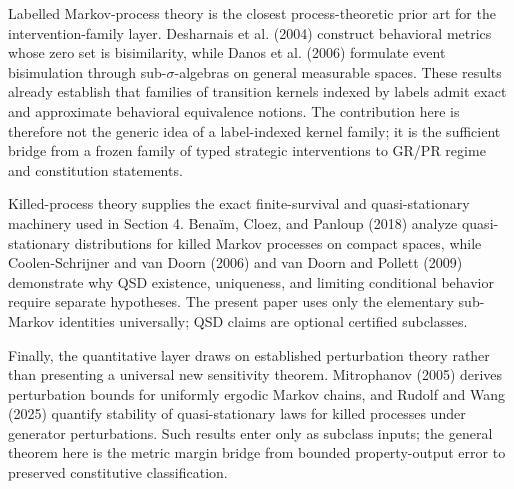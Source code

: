 \documentclass[10pt]{article}
\begin{document}
Labelled Markov-process theory is the closest process-theoretic prior art for the intervention-family layer. Desharnais et al. (2004) construct behavioral metrics whose zero set is bisimilarity, while Danos et al. (2006) formulate event bisimulation through sub-$\sigma$-algebras on general measurable spaces. These results already establish that families of transition kernels indexed by labels admit exact and approximate behavioral equivalence notions. The contribution here is therefore not the generic idea of a label-indexed kernel family; it is the sufficient bridge from a frozen family of typed strategic interventions to GR/PR regime and constitution statements.

Killed-process theory supplies the exact finite-survival and quasi-stationary machinery used in Section 4. Bena\"im, Cloez, and Panloup (2018) analyze quasi-stationary distributions for killed Markov processes on compact spaces, while Coolen-Schrijner and van Doorn (2006) and van Doorn and Pollett (2009) demonstrate why QSD existence, uniqueness, and limiting conditional behavior require separate hypotheses. The present paper uses only the elementary sub-Markov identities universally; QSD claims are optional certified subclasses.

Finally, the quantitative layer draws on established perturbation theory rather than presenting a universal new sensitivity theorem. Mitrophanov (2005) derives perturbation bounds for uniformly ergodic Markov chains, and Rudolf and Wang (2025) quantify stability of quasi-stationary laws for killed processes under generator perturbations. Such results enter only as subclass inputs; the general theorem here is the metric margin bridge from bounded property-output error to preserved constitutive classification.
\end{document}
